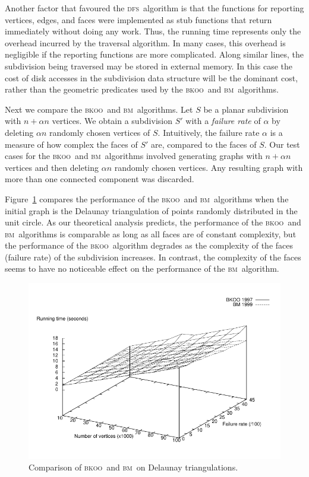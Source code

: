 \documentclass{article}
\newlength{\graphheight}
\newcommand{\figlabel}[1]{\label{fig:#1}}
\newcommand{\figref}[1]{\mbox{Figure~\ref{fig:#1}}}
\newcommand{\bkoo}{\textsc{bkoo}}
\newcommand{\bosemorin}{\textsc{bm}}
\newcommand{\dfs}{\textsc{dfs}}
\begin{document}
Another factor that favoured the \dfs\ algorithm is that the functions
for reporting vertices, edges, and faces were implemented as stub
functions that return immediately without doing any work.  Thus, the
running time represents only the overhead incurred by the traversal
algorithm.  In many cases, this overhead is negligible if the
reporting functions are more complicated.  Along similar lines, the
subdivision being traversed may be stored in external memory.  In this
case the cost of disk accesses in the subdivision data structure will
be the dominant cost, rather than the geometric predicates used by the
\bkoo\ and \bosemorin\ algorithms.

Next we compare the \bkoo\ and \bosemorin\ algorithms.  Let $S$ be a planar
subdivision with $n+\alpha n$ vertices.  We obtain a subdivision $S'$
with a {\em failure rate} of $\alpha$ by deleting $\alpha n$ randomly
chosen vertices of $S$. Intuitively, the failure rate $\alpha$ is a
measure of how complex the faces of $S'$ are, compared to the faces of
$S$.  Our test cases for the \bkoo\ and \bosemorin\ algorithms involved
generating graphs with $n+\alpha n$ vertices and then deleting $\alpha
n$ randomly chosen vertices.  Any resulting graph with more than one
connected component was discarded.

\figref{delaunay} compares the performance of the \bkoo\ and \bosemorin\
algorithms when the initial graph is the Delaunay triangulation of
points randomly distributed in the unit circle.  As our theoretical
analysis predicts, the performance of the \bkoo\ and \bosemorin\ algorithms
is comparable as long as all faces are of constant complexity, but the
performance of the \bkoo\ algorithm degrades as the complexity of the
faces (failure rate) of the subdivision increases.  In contrast, the
complexity of the faces seems to have no noticeable effect on the
performance of the \bosemorin\ algorithm.

\begin{figure}
\centerline{\includegraphics[height=\graphheight]{delaunay}}
\caption{Comparison of \bkoo\ and \bosemorin\ on Delaunay triangulations.}
\figlabel{delaunay}
\end{figure}
\end{document}
